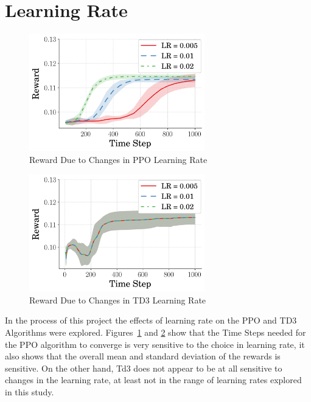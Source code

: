 \documentclass[10pt,twocolumn,letterpaper]{article}
\begin{document}
{\small


}

\appendix

\section{Learning Rate}
\label{app:lr_changes}
\begin{figure}[b]
\begin{center}
        \includegraphics[width=3in]{figures/comp_learning_rate/avg_rew_ppo.png}
        \caption{Reward Due to Changes in PPO Learning Rate}
        \label{fig:ppo_rew}
\end{center}
\end{figure}

\begin{figure}[tb]
\begin{center}
        \includegraphics[width=3in]{figures/comp_learning_rate/avg_rew_td3.png}
        \caption{Reward Due to Changes in TD3 Learning Rate}
        \label{fig:td3_rew}
\end{center}
\end{figure}
        
In the process of this project the effects of learning rate on the PPO and TD3 Algorithms were explored.
Figures~\ref{fig:ppo_rew} and \ref{fig:td3_rew} show that the Time Steps needed for the PPO algorithm to converge is very sensitive to the choice in learning rate, it also shows that the overall mean and standard deviation of the rewards is sensitive. On the other hand, Td3 does not appear to be at all sensitive to changes in the learning rate, at least not in the range of learning rates explored in this study.
\end{document}
